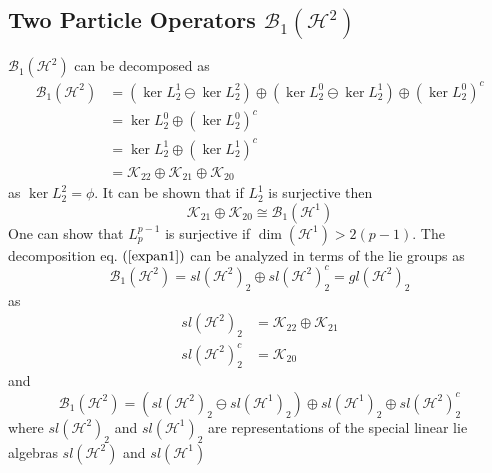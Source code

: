 \documentclass[aps,preprint]{revtex4}%
\begin{document}
\subsection{Two Particle Operators $\mathcal{B}_{1}\left(  \mathcal{H}%
^{2}\right)  $}

$\mathcal{B}_{1}\left(  \mathcal{H}^{2}\right)  $ can be decomposed as
\begin{align}
\mathcal{B}_{1}\left(  \mathcal{H}^{2}\right)   &  =\left(  \ker L_{2}%
^{1}\ominus\ker L_{2}^{2}\right)  \oplus\left(  \ker L_{2}^{0}\ominus\ker
L_{2}^{1}\right)  \oplus\left(  \ker L_{2}^{0}\right)  ^{c}\nonumber\\
&  =\ker L_{2}^{0}\oplus\left(  \ker L_{2}^{0}\right)  ^{c}\nonumber\\
&  =\ker L_{2}^{1}\oplus\left(  \ker L_{2}^{1}\right)  ^{c}\label{expan1}\\
&  =\mathcal{K}_{22}\oplus\mathcal{K}_{21}\oplus\mathcal{K}_{20}%
\end{align}
as $\ker L_{2}^{2}=\phi$. It can be shown that if $L_{2}^{1}$ is surjective
then
\begin{equation}
\mathcal{K}_{21}\oplus\mathcal{K}_{20}\cong\mathcal{B}_{1}\left(
\mathcal{H}^{1}\right)
\end{equation}
One can show that $L_{p}^{p-1}$ is surjective if $\dim\left(  \mathcal{H}%
^{1}\right)  >2(p-1).$ The decomposition eq. $\left(  \ref{expan1}\right)  $
can be analyzed in terms of the lie groups as
\begin{equation}
\mathcal{B}_{1}\left(  \mathcal{H}^{2}\right)  =sl\left(  \mathcal{H}%
^{2}\right)  _{2}\oplus sl\left(  \mathcal{H}^{2}\right)  _{2}^{c}=gl\left(
\mathcal{H}^{2}\right)  _{2}%
\end{equation}
as
\begin{align}
sl\left(  \mathcal{H}^{2}\right)  _{2} &  =\mathcal{K}_{22}\oplus
\mathcal{K}_{21}\nonumber\\
sl\left(  \mathcal{H}^{2}\right)  _{2}^{c} &  =\mathcal{K}_{20}%
\end{align}
and
\begin{equation}
\mathcal{B}_{1}\left(  \mathcal{H}^{2}\right)  =\left(  sl\left(
\mathcal{H}^{2}\right)  _{2}\ominus sl\left(  \mathcal{H}^{1}\right)
_{2}\right)  \oplus sl\left(  \mathcal{H}^{1}\right)  _{2}\oplus sl\left(
\mathcal{H}^{2}\right)  _{2}^{c}%
\end{equation}
where $sl\left(  \mathcal{H}^{2}\right)  _{2}$ and $sl\left(  \mathcal{H}%
^{1}\right)  _{2}$ are representations of the special linear lie algebras
$sl\left(  \mathcal{H}^{2}\right)  $ and $sl\left(  \mathcal{H}^{1}\right)  $
\end{document}

